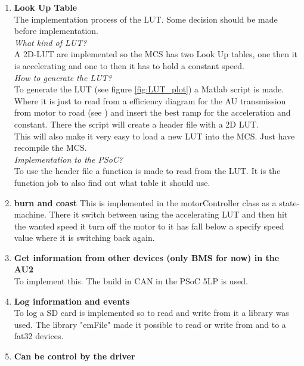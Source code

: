 \begin{enumerate} %
	\item \textbf{Look Up Table}\\
	The implementation process of the LUT. Some decision should be made before implementation.\\
	\subitem \textit{What kind of LUT?}\\
	A 2D-LUT are implemented so the MCS has two Look Up tables, one then it is accelerating and one to then it has to hold a constant speed.\\
	\subitem \textit{How to generate the LUT?}\\
	To generate the LUT (see figure \vref{fig:LUT_plot}) a Matlab script\cite{LUTscript} is made. Where it is just to read from a efficiency diagram for the AU transmission from motor to road  (see \cite{BAC_zenith33}) and insert the best ramp for the acceleration and constant. There the script will create a header file with a 2D LUT.\\
	This will also make it very easy to load a new LUT into the MCS. Just have recompile the MCS.\\
	\subitem \textit{Implementation to the PSoC?}\\
	To use the header file a function is made to read from the LUT. It is the function job to also find out what table it should use.\\	
	\item \textbf{burn and coast}
	This is implemented in the motorController class as a state-machine. There it switch between using the accelerating LUT and then hit the wanted speed it turn off the motor to it has fall below a specify speed value where it is switching back again. \\
	\item \textbf{Get information from other devices (only BMS for now) in the AU2}\\
	To implement this. The build in CAN in the PSoC 5LP is used.\\
	\item \textbf{Log information and events}\\
	To log a SD card is implemented so to read and write from it a library was used. The library "emFile" made it possible to read or write from and to a fat32 devices.\\
	\item \textbf{Can be control by the driver}\\

\end{enumerate}
